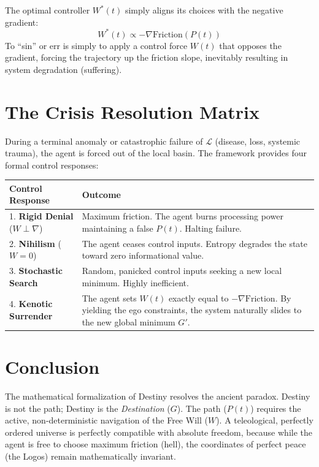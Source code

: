\documentclass[12pt, a4paper]{article}
\theoremstyle{plain}
\theoremstyle{definition}
\theoremstyle{remark}
\newcommand{\calL}{\mathcal{L}}
\begin{document}
The optimal controller $W^*(t)$ simply aligns its choices with the negative gradient:
\begin{equation}
    W^*(t) \propto -\nabla \text{Friction}(P(t))
\end{equation}
To ``sin'' or err is simply to apply a control force $W(t)$ that opposes the gradient, forcing the trajectory up the friction slope, inevitably resulting in system degradation (suffering).

\section{The Crisis Resolution Matrix}\label{sec:crisis}

During a terminal anomaly or catastrophic failure of $\calL$ (disease, loss, systemic trauma), the agent is forced out of the local basin. The framework provides four formal control responses:

\begin{center}
\begin{tabular}{lp{8cm}}
\toprule
\textbf{Control Response} & \textbf{Outcome} \\
\midrule
1. \textbf{Rigid Denial} ($W \perp \nabla$) & Maximum friction. The agent burns processing power maintaining a false $P(t)$. Halting failure. \\
2. \textbf{Nihilism} ($W = 0$) & The agent ceases control inputs. Entropy degrades the state toward zero informational value. \\
3. \textbf{Stochastic Search} & Random, panicked control inputs seeking a new local minimum. Highly inefficient. \\
4. \textbf{Kenotic Surrender} & The agent sets $W(t)$ exactly equal to $-\nabla \text{Friction}$. By yielding the ego constraints, the system naturally slides to the new global minimum $G'$. \\
\bottomrule
\end{tabular}
\end{center}

\section{Conclusion}

The mathematical formalization of Destiny resolves the ancient paradox. Destiny is not the path; Destiny is the \emph{Destination} ($G$). The path ($P(t)$) requires the active, non-deterministic navigation of the Free Will ($W$). A teleological, perfectly ordered universe is perfectly compatible with absolute freedom, because while the agent is free to choose maximum friction (hell), the coordinates of perfect peace (the Logos) remain mathematically invariant.
\end{document}
